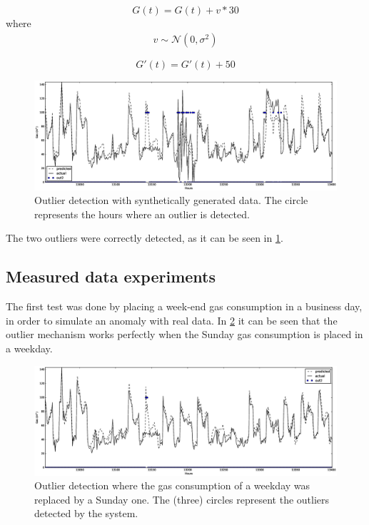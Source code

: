 \documentclass{sig-alternate-sigmod07}
\begin{document}
\begin{equation}G(t)= G(t)+v*30\label{equation:synt1} \end{equation}
where 
\begin{align*}v \sim \mathcal{N} (0,\sigma^2) \end{align*}

\begin{equation}G'(t)= G'(t)+50\label{equation:synt2} \end{equation}

\begin{figure}
\centering
\includegraphics[width=\textwidth]{images/outliersSynt.eps}
\caption{Outlier detection with synthetically generated data. The circle represents the hours where an outlier is detected.}
\label{fig:outlierSynt}
\end{figure}

The two outliers were correctly detected, as it can be seen in \cref{fig:outlierSynt}.



\subsection{Measured data experiments}
The first test was done by placing a week-end gas consumption in a business day, in order to simulate an anomaly with real data. In \cref{fig:outlierReal} it can be seen that the outlier mechanism works perfectly when the Sunday gas consumption is placed in a weekday. 

\begin{figure}
\centering
\includegraphics[width=\textwidth]{images/outliersReal.eps}
\caption{Outlier detection where the gas consumption of a weekday was replaced by a Sunday one. The (three) circles represent the outliers detected by the system.}
\label{fig:outlierReal}
\end{figure}
\end{document}
